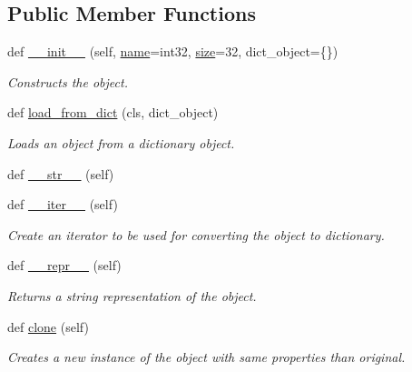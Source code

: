 \subsection*{Public Member Functions}
\begin{DoxyCompactItemize}
\item 
def \hyperlink{classsylva_1_1base_1_1sdf_1_1_data_token_type_ae0e89b38521c627297b30d5e7268a90b}{\+\_\+\+\_\+init\+\_\+\+\_\+} (self, \hyperlink{classsylva_1_1base_1_1sdf_1_1_data_token_type_a64214bba14fcba747fd608caef007924}{name}=\textquotesingle{}int32\textquotesingle{}, \hyperlink{classsylva_1_1base_1_1sdf_1_1_data_token_type_abf397c07db4eced64bf773de13fcbbf0}{size}=32, dict\+\_\+object=\{\})
\begin{DoxyCompactList}\small\item\em Constructs the object. \end{DoxyCompactList}\item 
def \hyperlink{classsylva_1_1base_1_1sdf_1_1_data_token_type_a24c66d6a5350bf4d8e6bcdaa64202c7c}{load\+\_\+from\+\_\+dict} (cls, dict\+\_\+object)
\begin{DoxyCompactList}\small\item\em Loads an object from a dictionary object. \end{DoxyCompactList}\item 
def \hyperlink{classsylva_1_1base_1_1sdf_1_1_data_token_type_ab44771f0368f95e63030117f12b7e36d}{\+\_\+\+\_\+str\+\_\+\+\_\+} (self)
\item 
def \hyperlink{classsylva_1_1base_1_1sylva__base_1_1_s_y_l_v_a_base_a8dc04df3b843a1deb6e1ae13f8425783}{\+\_\+\+\_\+iter\+\_\+\+\_\+} (self)
\begin{DoxyCompactList}\small\item\em Create an iterator to be used for converting the object to dictionary. \end{DoxyCompactList}\item 
def \hyperlink{classsylva_1_1base_1_1sylva__base_1_1_s_y_l_v_a_base_a5bd08c41ab09c380433d0de82fb98860}{\+\_\+\+\_\+repr\+\_\+\+\_\+} (self)
\begin{DoxyCompactList}\small\item\em Returns a string representation of the object. \end{DoxyCompactList}\item 
def \hyperlink{classsylva_1_1base_1_1sylva__base_1_1_s_y_l_v_a_base_a1597b4594cb73e0fa2597742239660f5}{clone} (self)
\begin{DoxyCompactList}\small\item\em Creates a new instance of the object with same properties than original. \end{DoxyCompactList}\end{DoxyCompactItemize}
